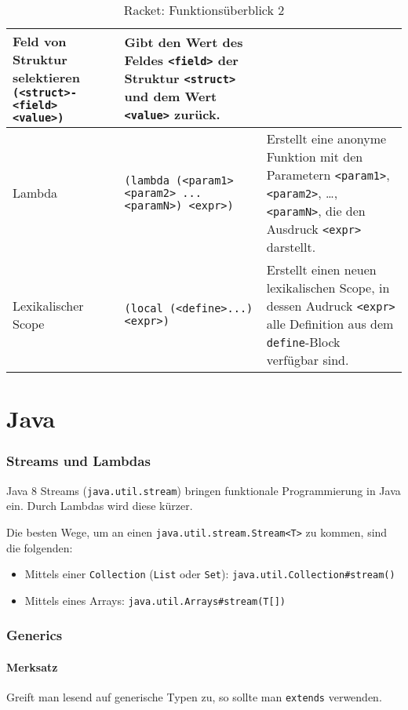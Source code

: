 \documentclass[a4paper, 11pt, accentcolor = tud3b]{tudreport}
\begin{document}
\begin{sidewaystable}
\begin{tabular}{p{5cm} | p{7cm} | p{9cm}}
                    \hline
                    Feld von Struktur selektieren \texttt{(<struct>-<field> <value>)} & Gibt den Wert des Feldes \texttt{<field>} der Struktur \texttt{<struct>} und dem Wert \texttt{<value>} zurück. \\
                    \hline
                    Lambda & \texttt{(lambda (<param1> <param2> ... <paramN>) <expr>)} & Erstellt eine anonyme Funktion mit den Parametern \texttt{<param1>}, \texttt{<param2>}, \dots, \texttt{<paramN>}, die den Ausdruck \texttt{<expr>} darstellt. \\
                    Lexikalischer Scope & \texttt{(local (<define>...) <expr>)} & Erstellt einen neuen lexikalischen Scope, in dessen Audruck \texttt{<expr>} alle Definition aus dem \texttt{define}-Block verfügbar sind. \\
                \end{tabular}
                \caption{Racket: Funktionsüberblick 2}
            \end{sidewaystable}




    \chapter{Java}
        \subsection{Streams und Lambdas}
            Java 8 Streams (\texttt{java.util.stream}) bringen funktionale Programmierung in Java ein. Durch Lambdas wird diese kürzer.

            Die besten Wege, um an einen \texttt{java.util.stream.Stream<T>} zu kommen, sind die folgenden:
            \begin{itemize}
                \item Mittels einer \texttt{Collection} (\texttt{List} oder \texttt{Set}): \texttt{java.util.Collection\#stream()}
                \item Mittels eines Arrays: \texttt{java.util.Arrays\#stream(T[])}
            \end{itemize}



        \subsection{Generics}
            \subsubsection{Merksatz}
                Greift man lesend auf generische Typen zu, so sollte man \texttt{extends} verwenden.
\end{document}
